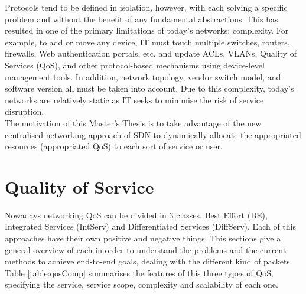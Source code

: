 
Protocols tend to be defined in isolation, however, with each solving a specific problem and without the benefit of any fundamental abstractions. This has resulted in one of the primary limitations of today's networks: complexity. For example, to add or move any device, IT must touch 
multiple switches, routers, firewalls, Web authentication portals, etc. and update ACLs, VLANs, Quality of Services (QoS), and other protocol-based mechanisms using device-level management tools. In addition, network topology, vendor switch model, and software version all must be taken into 
account. Due to this complexity, today's networks are relatively static as IT seeks to minimise the risk of service disruption.\\

The motivation of this Master's Thesis is to take advantage of the new centralised networking approach of SDN to dynamically allocate the appropriated resources (appropriated QoS) to each sort of service or user.    




\section{Quality of Service}
\label{sec:qos}

Nowadays networking QoS can be divided in 3 classes, Best Effort (BE), Integrated Services (IntServ) and Differentiated Services (DiffServ). Each of this approaches have their own positive and negative things. This sections give a general overview of each in order to understand the problems and the current methods to achieve end-to-end goals, dealing with the different kind of packets.\\ 

Table \ref{table:qosComp} summarises the features of this three types of QoS, specifying the service, service scope, complexity and scalability of each one.

